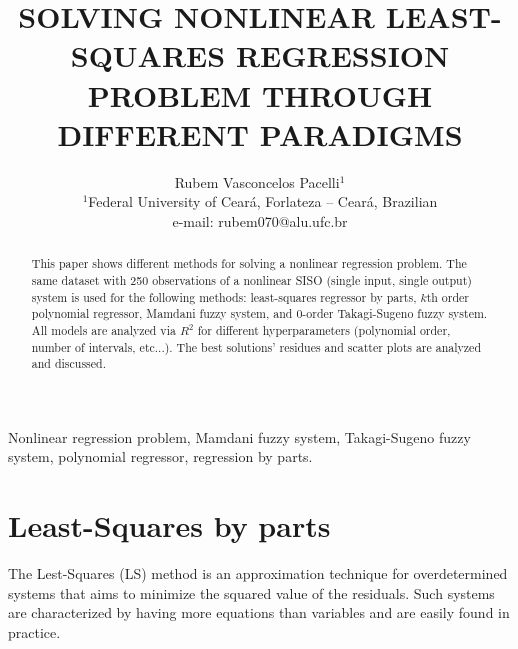 \documentclass[english]{sobraep}
\title{SOLVING NONLINEAR LEAST-SQUARES REGRESSION PROBLEM THROUGH DIFFERENT PARADIGMS}
\author{Rubem Vasconcelos Pacelli$^{1}$\\
	\normalsize $^{1}$Federal University of Ceará, Forlateza -- Ceará, Brazilian\\
	\normalsize e-mail: rubem070@alu.ufc.br
}
\begin{document}
\maketitle

\begin{abstract}
	This paper shows different methods for solving a nonlinear regression problem. The same dataset with 250 observations of a nonlinear SISO (single input, single output) system is used for the following methods: least-squares regressor by parts, $k$th order polynomial regressor, Mamdani fuzzy system, and 0-order Takagi-Sugeno fuzzy system. All models are analyzed via $R^2$ for different hyperparameters (polynomial order, number of intervals, etc...). The best solutions' residues and scatter plots are analyzed and discussed.
\end{abstract}

\begin{keywords}
	Nonlinear regression problem, Mamdani fuzzy system, Takagi-Sugeno fuzzy system, polynomial regressor, regression by parts. 
\end{keywords}






\section{Least-Squares by parts}

The Lest-Squares (LS) method is an approximation technique for overdetermined systems that aims to minimize the squared value of the residuals. Such systems are characterized by having more equations than variables and are easily found in practice.
\end{document}
